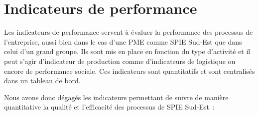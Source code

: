 \section{Indicateurs de performance}

    Les indicateurs de performance servent à évaluer la performance des processus de l'entreprise, aussi bien dans le cas d'une PME comme SPIE Sud-Est que dans celui d'un grand groupe. Ils sont mis en place en fonction du type d'activité et il peut s'agir d'indicateur de production comme d'indicateurs de logistique ou encore de performance sociale. Ces indicateurs sont quantitatifs et sont centralisés dans un tableau de bord.

    Nous avons donc dégagés les indicateurs permettant de suivre de manière quantitative la qualité et l'efficacité des processus de SPIE Sud-Est~:

